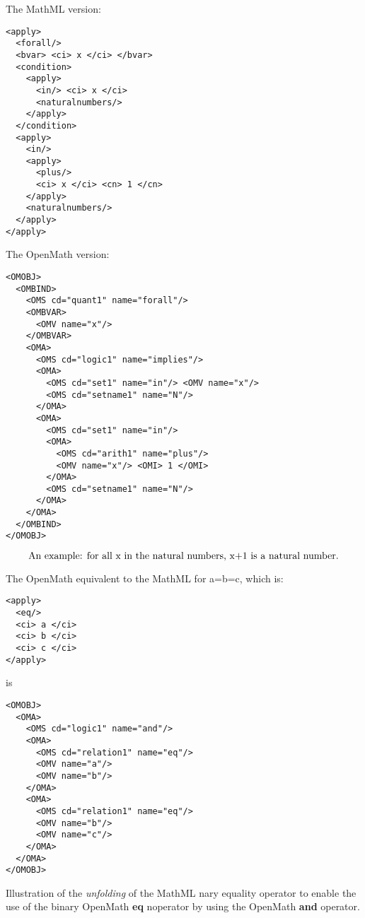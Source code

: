 \documentclass[twoside,11pt]{article}
\begin{document}
\begin{center}
\begin{myboxbopen}{4.5in}
The MathML version:
\begin{verbatim}
<apply>
  <forall/>
  <bvar> <ci> x </ci> </bvar>
  <condition>
    <apply>
      <in/> <ci> x </ci>
      <naturalnumbers/>
    </apply>
  </condition>
  <apply>
    <in/>
    <apply>
      <plus/>
      <ci> x </ci> <cn> 1 </cn>
    </apply>
    <naturalnumbers/>
  </apply>
</apply>
\end{verbatim}
\end{myboxbopen}\end{center}
\begin{center}
\begin{myboxtopen}{4.5in}
The OpenMath version:
\begin{verbatim}
<OMOBJ>
  <OMBIND>
    <OMS cd="quant1" name="forall"/>
    <OMBVAR>
      <OMV name="x"/>
    </OMBVAR>
    <OMA>
      <OMS cd="logic1" name="implies"/>
      <OMA>
        <OMS cd="set1" name="in"/> <OMV name="x"/>
        <OMS cd="setname1" name="N"/>
      </OMA>
      <OMA>
        <OMS cd="set1" name="in"/>
        <OMA>
          <OMS cd="arith1" name="plus"/>
          <OMV name="x"/> <OMI> 1 </OMI>
        </OMA>
        <OMS cd="setname1" name="N"/>
      </OMA>
    </OMA>
  </OMBIND>
</OMOBJ>
\end{verbatim}
\end{myboxtopen}
\end{center}
\begin{equation}
\hbox{An example: for all x in the natural numbers, x+1 is a natural number.}
\label{forall}
\end{equation}

\begin{center}
\begin{mybox}{4.5in}

The OpenMath equivalent to the MathML for a=b=c, which is:
\begin{verbatim}
<apply>
  <eq/>
  <ci> a </ci>
  <ci> b </ci>
  <ci> c </ci>
</apply>
\end{verbatim}
is
\begin{verbatim}
<OMOBJ>
  <OMA>
    <OMS cd="logic1" name="and"/>
    <OMA>
      <OMS cd="relation1" name="eq"/>
      <OMV name="a"/>
      <OMV name="b"/>
    </OMA>
    <OMA>
      <OMS cd="relation1" name="eq"/>
      <OMV name="b"/>
      <OMV name="c"/>
    </OMA>
  </OMA>
</OMOBJ>

\end{verbatim}
\end{mybox}
\end{center}
\begin{center}
Illustration of the {\em unfolding} of the MathML nary equality operator
to enable the use of the binary OpenMath {\bf eq} noperator by using the
OpenMath {\bf and} operator.
\end{center}
\begin{equation}\label{eq-unfold}
\end{equation}
\end{document}

